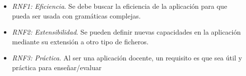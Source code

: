 \begin{itemize}
\item \textit{RNF1: Eficiencia}. Se debe buscar la eficiencia de la aplicación para que pueda ser usada con gramáticas complejas.
\item \textit{RNF2: Extensibilidad}. Se pueden definir nuevas capacidades en la aplicación mediante su extensión a otro tipo de ficheros.
\item \textit{RNF3: Práctica}. Al ser una aplicación docente, un requisito es que sea útil y práctica para enseñar/evaluar
\end{itemize}